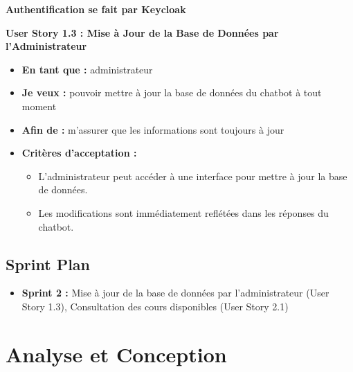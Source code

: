 \documentclass[a4paper, 11pt, openany]{report}
\begin{document}
\textbf{Authentification se fait par Keycloak}

\textbf{User Story 1.3 : Mise à Jour de la Base de Données par l’Administrateur}
\begin{itemize}
    \item \textbf{En tant que :} administrateur
    \item \textbf{Je veux :} pouvoir mettre à jour la base de données du chatbot à tout moment
    \item \textbf{Afin de :} m’assurer que les informations sont toujours à jour
    \item \textbf{Critères d'acceptation :}
    \begin{itemize}
        \item L’administrateur peut accéder à une interface pour mettre à jour la base de données.
        \item Les modifications sont immédiatement reflétées dans les réponses du chatbot.
    \end{itemize}
\end{itemize}

\subsection{Sprint Plan}
\begin{itemize}
    \item \textbf{Sprint 2 :} Mise à jour de la base de données par l’administrateur (User Story 1.3), Consultation des cours disponibles (User Story 2.1)
\end{itemize}

\section{Analyse et Conception}
\end{document}
